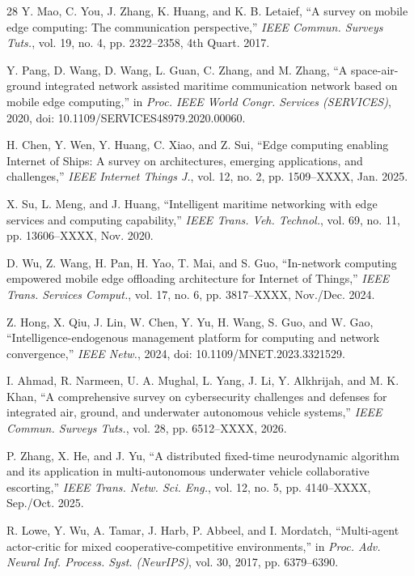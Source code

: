 \documentclass[lettersize,journal]{IEEEtran}
\begin{document}
\begin{thebibliography}{28}
Y. Mao, C. You, J. Zhang, K. Huang, and K. B. Letaief, ``A survey on mobile edge computing: The communication perspective,'' \textit{IEEE Commun. Surveys Tuts.}, vol. 19, no. 4, pp. 2322--2358, 4th Quart. 2017.

Y. Pang, D. Wang, D. Wang, L. Guan, C. Zhang, and M. Zhang, ``A space-air-ground integrated network assisted maritime communication network based on mobile edge computing,'' in \textit{Proc. IEEE World Congr. Services (SERVICES)}, 2020, doi: 10.1109/SERVICES48979.2020.00060.

H. Chen, Y. Wen, Y. Huang, C. Xiao, and Z. Sui, ``Edge computing enabling Internet of Ships: A survey on architectures, emerging applications, and challenges,'' \textit{IEEE Internet Things J.}, vol. 12, no. 2, pp. 1509--XXXX, Jan. 2025.

X. Su, L. Meng, and J. Huang, ``Intelligent maritime networking with edge services and computing capability,'' \textit{IEEE Trans. Veh. Technol.}, vol. 69, no. 11, pp. 13606--XXXX, Nov. 2020.

D. Wu, Z. Wang, H. Pan, H. Yao, T. Mai, and S. Guo, ``In-network computing empowered mobile edge offloading architecture for Internet of Things,'' \textit{IEEE Trans. Services Comput.}, vol. 17, no. 6, pp. 3817--XXXX, Nov./Dec. 2024.

Z. Hong, X. Qiu, J. Lin, W. Chen, Y. Yu, H. Wang, S. Guo, and W. Gao, ``Intelligence-endogenous management platform for computing and network convergence,'' \textit{IEEE Netw.}, 2024, doi: 10.1109/MNET.2023.3321529.

I. Ahmad, R. Narmeen, U. A. Mughal, L. Yang, J. Li, Y. Alkhrijah, and M. K. Khan, ``A comprehensive survey on cybersecurity challenges and defenses for integrated air, ground, and underwater autonomous vehicle systems,'' \textit{IEEE Commun. Surveys Tuts.}, vol. 28, pp. 6512--XXXX, 2026.

P. Zhang, X. He, and J. Yu, ``A distributed fixed-time neurodynamic algorithm and its application in multi-autonomous underwater vehicle collaborative escorting,'' \textit{IEEE Trans. Netw. Sci. Eng.}, vol. 12, no. 5, pp. 4140--XXXX, Sep./Oct. 2025.

R. Lowe, Y. Wu, A. Tamar, J. Harb, P. Abbeel, and I. Mordatch, ``Multi-agent actor-critic for mixed cooperative-competitive environments,'' in \textit{Proc. Adv. Neural Inf. Process. Syst. (NeurIPS)}, vol. 30, 2017, pp. 6379--6390.


\end{thebibliography}
\end{document}
